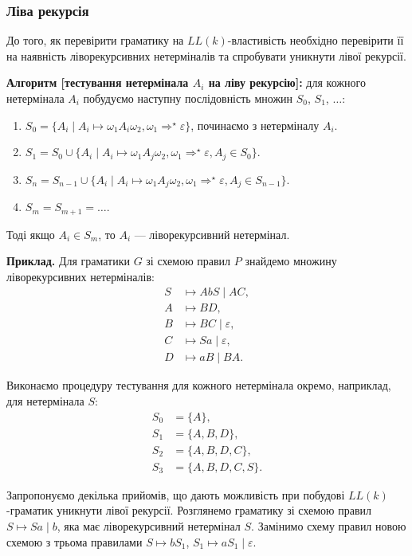 \subsubsection{Ліва рекурсія}

До того, як перевірити граматику на $LL(k)$-властивість необхідно перевірити її на наявність ліворекурсивних нетерміналів та спробувати уникнути лівої рекурсії. \medskip

\textbf{Алгоритм [тестування нетермінала $A_i$ на ліву рекурсію]:} для кожного нетермінала $A_i$ побудуємо наступну послідовність множин $S_0$, $S_1$, $\ldots$:
\begin{enumerate}
	\item $S_0 = \{A_i \mid A_i \mapsto \omega_1 A_i \omega_2, \omega_1 \Rightarrow^\star \varepsilon \}$, починаємо з нетерміналу $A_i$.
	\item $S_1 = S_0 \cup \{ A_i \mid A_i \mapsto \omega_1 A_j \omega_2, \omega_1 \Rightarrow^\star \varepsilon, A_j \in S_0\}$.
	\item $S_n = S_{n-1} \cup \{ A_i \mid A_i \mapsto \omega_1 A_j \omega_2, \omega_1 \Rightarrow^\star \varepsilon, A_j \in S_{n-1}\}$.
	\item $S_m = S_{m + 1} = \ldots$.
\end{enumerate}

Тоді якщо $A_i \in S_m$, то $A_i$ --- ліворекурсивний нетермінал.\medskip

\textbf{Приклад.} Для граматики $G$ зі схемою правил $P$ знайдемо множину ліворекурсивних нетерміналів:
\begin{align}
	S &\mapsto AbS \mid AC, \\
	A &\mapsto BD, \\
	B &\mapsto BC \mid \varepsilon, \\
	C &\mapsto Sa \mid \varepsilon, \\
	D &\mapsto aB \mid BA.
\end{align}

Виконаємо процедуру тестування для кожного нетермінала окремо, наприклад, для нетермінала $S$: 
\begin{align}
	S_0 &= \{A\}, \\
	S_1 &= \{A, B, D\}, \\
	S_2 &= \{A, B, D, C\}, \\
	S_3 &= \{A, B, D, C, S\}.
\end{align}

Запропонуємо декілька прийомів, що дають можливість при побудові $LL(k)$-гра\-ма\-тик уникнути лівої рекурсії. Розглянемо граматику зі схемою правил $S \mapsto Sa \mid b$, яка має ліворекурсивний нетермінал $S$. Замінимо схему правил новою схемою з трьома правилами $S \mapsto bS_1$, $S_1 \mapsto aS_1 \mid \varepsilon$. \medskip

